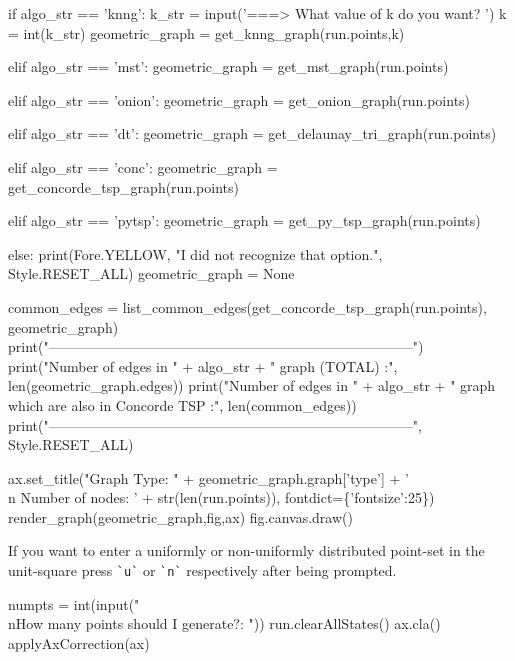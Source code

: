 if algo_str == 'knng':
      k_str = input('===> What value of k do you want? ')
      k     = int(k_str)
      geometric_graph = get_knng_graph(run.points,k)

elif algo_str == 'mst':
     geometric_graph = get_mst_graph(run.points)

elif algo_str == 'onion':
     geometric_graph = get_onion_graph(run.points)

elif algo_str == 'dt':
      geometric_graph = get_delaunay_tri_graph(run.points)

elif algo_str == 'conc':
     geometric_graph = get_concorde_tsp_graph(run.points)

elif algo_str == 'pytsp':
     geometric_graph = get_py_tsp_graph(run.points)

else:
      print(Fore.YELLOW, "I did not recognize that option.", Style.RESET_ALL)
      geometric_graph = None

common_edges = list_common_edges(get_concorde_tsp_graph(run.points), geometric_graph)
print("------------------------------------------------------------------------------")
print("Number of edges in " + algo_str + " graph (TOTAL)                          :", len(geometric_graph.edges))
print("Number of edges in " + algo_str + " graph which are also in Concorde TSP   :", len(common_edges))
print("------------------------------------------------------------------------------", Style.RESET_ALL)



ax.set_title("Graph Type: " + geometric_graph.graph['type'] + '\\n Number of nodes: ' + str(len(run.points)), fontdict=\{'fontsize':25\})
render_graph(geometric_graph,fig,ax)
fig.canvas.draw()
\nwendcode{}\nwdocspar

If you want to enter a uniformly or non-uniformly distributed point-set in the unit-square press \verb|`u`| or \verb|`n`|
respectively after being prompted. 

\nwenddocs{}\endmoddef\nwstartdeflinemarkup{}\nwenddeflinemarkup
numpts = int(input("\\nHow many points should I generate?: ")) 
run.clearAllStates()
ax.cla()
applyAxCorrection(ax)

